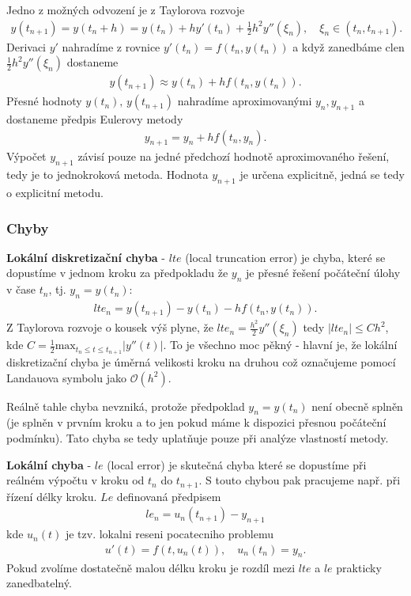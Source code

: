 Jedno z možných odvození je z Taylorova rozvoje
\begin{align}
y(t_{n+1}) = y(t_{n}+h)= y(t_{n})+hy'(t_{n}) + \frac{1}{2} h^{2} y''(\xi_{n}), \quad \xi_{n} \in (t_{n}, t_{n+1}).
\end{align}
Derivaci $y'$ nahradíme z rovnice $y'(t_{n})=f(t_{n},y(t_{n}))$ a když zanedbáme clen $\frac{1}{2} h^{2} y''(\xi_{n})$ dostaneme
\begin{align}
y(t_{n+1}) \approx y(t_{n})+h f(t_{n},y(t_{n})).
\end{align}
Přesné hodnoty $y(t_{n}), \, y(t_{n+1})$ nahradíme aproximovanými $y_{n}, y_{n+1}$ a dostaneme předpis Eulerovy metody
\begin{align}
y_{n+1}= y_{n} + hf(t_{n}, y_{n}).
\end{align}
Výpočet $y_{n+1}$ závisí pouze na jedné předchozí hodnotě aproximovaného řešení, tedy je to jednokroková metoda. Hodnota $y_{n+1}$ je určena explicitně, jedná se tedy o explicitní metodu. 

\subsubsection*{Chyby}
\textbf{Lokální diskretizační chyba} - $lte$ (local truncation error) je chyba, které se dopustíme v jednom kroku za předpokladu že $y_{n}$ je přesné řešení počáteční úlohy v čase $t_{n}$, tj. $y_{n}=y(t_{n})$:
\begin{align}
lte_{n}= y(t_{n+1})-y(t_{n})-h f(t_{n},y(t_{n})).
\end{align}
Z Taylorova rozvoje o kousek výš plyne, že $lte_{n}=\frac{h^{2}}{2} y''(\xi_{n})$ tedy $\vert lte_{n} \vert \leq C h^{2}$, kde $C=\frac{1}{2} \mathrm{max}_{t_{n}\leq t \leq t_{n+1}} \vert y''(t) \vert $. To je všechno moc pěkný - hlavní je, že lokální diskretizační chyba je úměrná velikosti kroku na druhou což označujeme pomocí Landauova symbolu jako $\mathcal{O}(h^{2})$.

Reálně tahle chyba nevzniká, protože předpoklad $y_{n}=y(t_{n})$ není obecně splněn (je splněn v prvním kroku a to jen pokud máme k dispozici přesnou počáteční podmínku). Tato chyba se tedy uplatňuje pouze při analýze vlastností metody.  

\textbf{Lokální chyba} - $le$ (local error)  je skutečná chyba které se dopustíme při reálném výpočtu v kroku od $t_{n}$ do $t_{n+1}$. S touto chybou pak pracujeme např. při řízení délky kroku.  $Le$ definovaná předpisem
\begin{align}
le_{n}=u_{n}(t_{n+1})-y_{n+1}
\end{align}
kde $u_{n}(t)$ je tzv. lokalni reseni pocatecniho problemu
\begin{align}
u'(t)=f(t,u_{n}(t)), \quad u_{n}(t_{n})=y_{n}.
\end{align}
Pokud zvolíme dostatečně malou délku kroku je rozdíl mezi $lte$ a $le$ prakticky zanedbatelný. 

